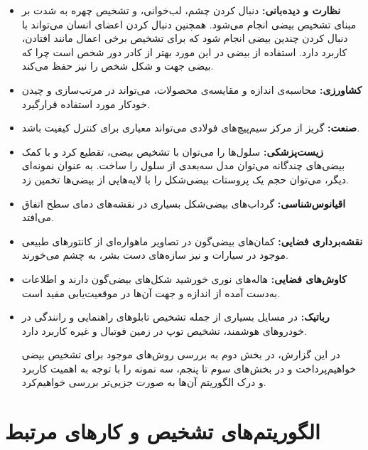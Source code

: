 \documentclass[12pt,a4paper]{article}
\numberwithin{equation}{section}
\numberwithin{figure}{section}
\theoremstyle{definition}
\theoremstyle{theorem}
\theoremstyle{definition}
\begin{document}
\begin{itemize}
\renewcommand{\labelitemi}{$\bullet$}
\item 
\textbf{نظارت و دیده‌بانی: } 
دنبال کردن چشم، لب‌‌خوانی، و تشخیص چهره به شدت بر مبنای تشخیص بیضی انجام می‌شود. همچنین دنبال کردن اعضای انسان می‌تواند با دنبال کردن چندین بیضی انجام شود که برای تشخیص برخی اعمال مانند افتادن، کاربرد دارد. استفاده از بیضی در این مورد بهتر از کادر دور شخص است چرا که بیضی جهت و شکل شخص را نیز حفظ می‌کند.

\item
\textbf{کشاورزی: }
محاسبه‌ی اندازه و مقایسه‌ی محصولات، می‌تواند در مرتب‌سازی و چیدن خودکار مورد استفاده قرارگیرد. 

\item 
\textbf{صنعت: }
گریز از مرکز سیم‌پیچ‌های فولادی می‌تواند معیاری برای کنترل کیفیت باشد.

\item 
\textbf{زیست‌پزشکی: }
سلول‌ها را می‌توان با تشخیص بیضی، تقطیع کرد و با کمک بیضی‌های چندگانه می‌توان مدل سه‌بعدی از سلول را ساخت. به عنوان نمونه‌ای دیگر، می‌توان حجم یک پروستات بیضی‌شکل را با لایه‌هایی از بیضی‌ها تخمین زد.

\item 
\textbf{اقیانوس‌شناسی: }
گرداب‌های بیضی‌شکل بسیاری در نقشه‌های دمای سطح اتفاق می‌افتد.

\item 
\textbf{نقشه‌برداری فضایی: }
کمان‌های بیضی‌گون در تصاویر ماهواره‌ای از کانتورهای طبیعی موجود در سیارات و نیز سازه‌های دست بشر، به چشم می‌خورند.

\item 
\textbf{کاوش‌های فضایی:‌ } 
هاله‌های نوری خورشید شکل‌های بیضی‌گون دارند و اطلاعات به‌دست آمده از اندازه و جهت آن‌ها در موقعیت‌یابی مفید است.


\item 
\textbf{رباتیک: }
در مسایل بسیاری از جمله تشخیص تابلوهای راهنمایی و رانندگی در خودروهای هوشمند، تشخیص توپ در زمین فوتبال و غیره کاربرد دارد.

در این گزارش، در بخش دوم به بررسی روش‌های موجود برای تشخیص بیضی خواهیم‌پرداخت و در بخش‌های سوم تا پنجم، سه نمونه را با توجه به اهمیت کاربرد و درک الگوریتم آن‌ها به صورت جزیی‌تر بررسی خواهیم‌کرد.

\end{itemize}

\newpage

\section{الگوریتم‌های تشخیص و کارهای مرتبط}
\end{document}
